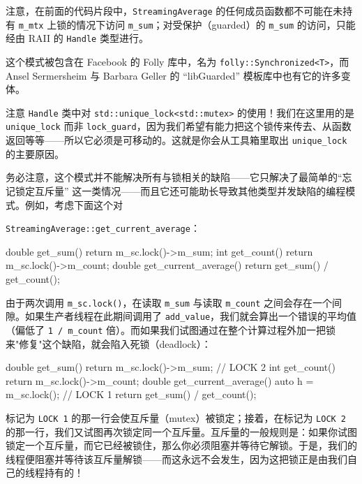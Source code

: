 注意，在前面的代码片段中，\texttt{Streaming\allowbreak{}Average} 的任何成员函数都不可能在未持有 \texttt{m\_\allowbreak{}mtx} 上锁的情况下访问 \texttt{m\_\allowbreak{}sum}；对受保护（guarded）的 \texttt{m\_\allowbreak{}sum} 的访问，只能经由 RAII 的 \texttt{Handle} 类型进行。

这个模式被包含在 Facebook 的 Folly 库中，名为 \texttt{folly::\allowbreak{}Synchronized<\allowbreak{}T>\allowbreak{}}，而 Ansel Sermersheim 与 Barbara Geller 的 “libGuarded” 模板库中也有它的许多变体。

注意 \texttt{Handle} 类中对 \texttt{std::\allowbreak{}unique\_\allowbreak{}lock<\allowbreak{}std::\allowbreak{}mutex>\allowbreak{}} 的使用！我们在这里用的是 \texttt{unique\_\allowbreak{}lock} 而非 \texttt{lock\_\allowbreak{}guard}，因为我们希望有能力把这个锁传来传去、从函数返回等等——所以它必须是可移动的。这就是你会从工具箱里取出 \texttt{unique\_\allowbreak{}lock} 的主要原因。

务必注意，这个模式并不能解决所有与锁相关的缺陷——它只解决了最简单的“忘记锁定互斥量” 这一类情况——而且它还可能助长导致其他类型并发缺陷的编程模式。例如，考虑下面这个对

\texttt{Streaming\allowbreak{}Average::\allowbreak{}get\_\allowbreak{}current\_\allowbreak{}average}：

\begin{codebox}[cpp]
    double get_sum() {
      return m_sc.lock()->m_sum;
    }
    int get_count() {
      return m_sc.lock()->m_count;
    }
    double get_current_average() {
      return get_sum() / get_count();
    }
\end{codebox}

由于两次调用 \texttt{m\_\allowbreak{}sc.\allowbreak{}lock(\allowbreak{})\allowbreak{}}，在读取 \texttt{m\_\allowbreak{}sum} 与读取 \texttt{m\_\allowbreak{}count} 之间会存在一个间隙。如果生产者线程在此期间调用了 \texttt{add\_\allowbreak{}value}，我们就会算出一个错误的平均值（偏低了 \texttt{1 /\allowbreak{} m\_\allowbreak{}count} 倍）。而如果我们试图通过在整个计算过程外加一把锁来"修复"这个缺陷，就会陷入死锁（deadlock）：

\begin{codebox}[cpp]
    double get_sum() {
      return m_sc.lock()->m_sum; // LOCK 2
    }
    int get_count() {
      return m_sc.lock()->m_count;
    }
    double get_current_average() {
      auto h = m_sc.lock(); // LOCK 1
      return get_sum() / get_count();
    }
\end{codebox}

标记为 \texttt{LOCK 1} 的那一行会使互斥量（mutex）被锁定；接着，在标记为 \texttt{LOCK 2} 的那一行，我们又试图再次锁定同一个互斥量。互斥量的一般规则是：如果你试图锁定一个互斥量，而它已经被锁住，那么你必须阻塞并等待它解锁。于是，我们的线程便阻塞并等待该互斥量解锁——而这永远不会发生，因为这把锁正是由我们自己的线程持有的！

